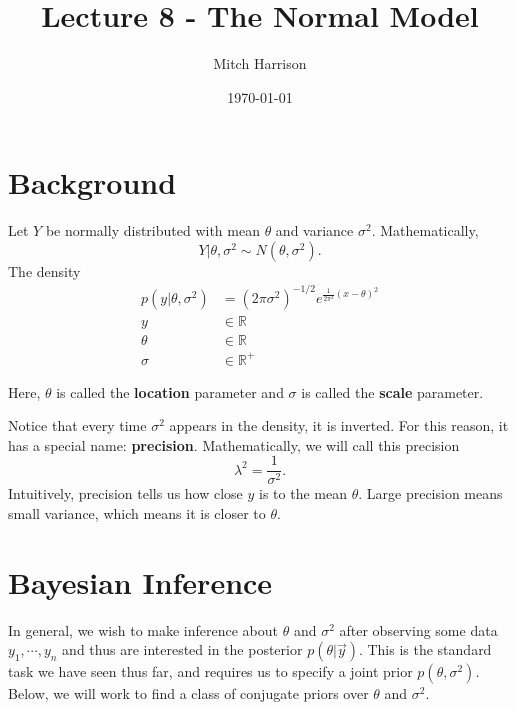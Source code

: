 \documentclass[titlepage, 12pt, leqno]{article}
\title{\Huge{Lecture 8 - The Normal Model}}
\author{\large{Mitch Harrison}}
\date{\today}
\begin{document}
\setlength{\parskip}{1\baselineskip}
\setlength{\parindent}{15pt}
\maketitle
\tableofcontents
\newpage


\section{Background}
Let $Y$ be normally distributed with mean $\theta$ and variance $\sigma^{2}$.
Mathematically,
\[
Y|\theta,\sigma^{2} \sim N(\theta,\sigma^{2}).
\]
The density
\begin{align*}
    p(y|\theta,\sigma^{2})  &= (2\pi\sigma^{2})^{-1/2}e^{\frac{1}{2\pi^{2}}
    (x - \theta)^{2}}\\
        y &\in \mathbb{R}\\
        \theta &\in  \mathbb{R}\\
        \sigma &\in \mathbb{R}^{+}
\end{align*}

Here, $\theta$ is called the \textbf{location} parameter and $\sigma$ is called
the \textbf{scale} parameter.

\begin{definition}
    Notice that every time $\sigma^{2}$ appears in the density, it is inverted. 
    For this reason, it has a special name: \textbf{precision}. Mathematically,
    we will call this precision
    \[
    \lambda^{2} = \frac{1}{\sigma^{2}}.
    \]
    Intuitively, precision tells us how close $y$ is to the mean $\theta$. Large
    precision means small variance, which means it is closer to $\theta$.
\end{definition}

\pagebreak
\section{Bayesian Inference}
In general, we wish to make inference about $\theta$ and $\sigma^{2}$ after
observing some data $y_{1}, \cdots ,y_{n}$ and thus are interested in the
posterior $p(\theta|\vec y)$. This is the standard task we have seen thus far,
and requires us to specify a joint prior $p(\theta, \sigma^{2})$. Below, we will
work to find a class of conjugate priors over $\theta$ and $\sigma^{2}$.
\end{document}
